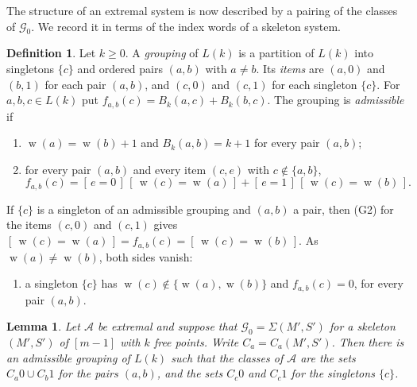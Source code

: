 \documentclass[11pt]{amsart}
\newtheorem{lemma}[theorem]{Lemma}
\theoremstyle{definition}
\newtheorem{definition}[theorem]{Definition}
\theoremstyle{remark}
\numberwithin{equation}{section}
\newcommand{\cA}{\mathcal{A}}
\newcommand{\cG}{\mathcal{G}}
\newcommand{\Iv}[1]{[\,#1\,]}
\DeclareMathOperator{\wt}{w}
\begin{document}
The structure of an extremal system is now described by a pairing of the classes of $\cG_0$. We record it in terms of the index words of a skeleton system.

\begin{definition}\label{def:grouping}
Let $k\ge0$. A \emph{grouping} of $L(k)$ is a partition of $L(k)$ into singletons $\{c\}$ and ordered pairs $(a,b)$ with $a\ne b$. Its \emph{items} are $(a,0)$ and $(b,1)$ for each pair $(a,b)$, and $(c,0)$ and $(c,1)$ for each singleton $\{c\}$. For $a,b,c\in L(k)$ put $f_{a,b}(c)=B_k(a,c)+B_k(b,c)$. The grouping is \emph{admissible} if
\begin{enumerate}[label=\textup{(G\arabic*)}]
\item $\wt(a)=\wt(b)+1$ and $B_k(a,b)=k+1$ for every pair $(a,b)$;
\item for every pair $(a,b)$ and every item $(c,e)$ with $c\notin\{a,b\}$,
\[
f_{a,b}(c)=\Iv{e=0}\,\Iv{\wt(c)=\wt(a)}+\Iv{e=1}\,\Iv{\wt(c)=\wt(b)} .
\]
\end{enumerate}
\end{definition}

If $\{c\}$ is a singleton of an admissible grouping and $(a,b)$ a pair, then (G2) for the items $(c,0)$ and $(c,1)$ gives $\Iv{\wt(c)=\wt(a)}=f_{a,b}(c)=\Iv{\wt(c)=\wt(b)}$. As $\wt(a)\ne\wt(b)$, both sides vanish:
\begin{enumerate}[label=\textup{(G3)}]
\item a singleton $\{c\}$ has $\wt(c)\notin\{\wt(a),\wt(b)\}$ and $f_{a,b}(c)=0$, for every pair $(a,b)$.
\end{enumerate}

\begin{lemma}\label{lem:grouping}
Let $\cA$ be extremal and suppose that $\cG_0=\Sigma(M',S')$ for a skeleton $(M',S')$ of $[m-1]$ with $k$ free points. Write $C_a=C_a(M',S')$. Then there is an admissible grouping of $L(k)$ such that the classes of $\cA$ are the sets $C_a0\cup C_b1$ for the pairs $(a,b)$, and the sets $C_c0$ and $C_c1$ for the singletons $\{c\}$.
\end{lemma}
\end{document}

